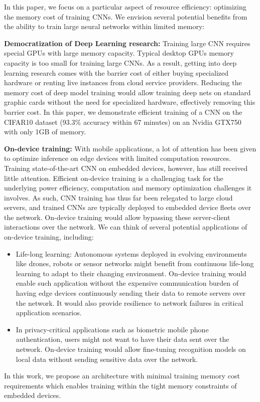 \documentclass[twocolumn]{bmcart}
\begin{document}
In this paper, we focus on a particular aspect of resource efficiency: optimizing the memory cost of training CNNs. 
We envision several potential benefits from the ability to train large neural networks within limited memory:

\textbf{Democratization of Deep Learning research:} 
Training large CNN requires special GPUs with large memory capacity. 
Typical desktop GPUs memory capacity is too small for training large CNNs.
As a result, getting into deep learning research comes with the barrier cost of either buying specialized hardware or renting live instances from cloud service providers. 
Reducing the memory cost of deep model training would allow training deep nets on standard graphic cards without the need for specialized hardware, effectively removing this barrier cost.
In this paper, we demonstrate efficient training of a CNN on the CIFAR10 dataset (93.3\% accuracy within 67 minutes) on an Nvidia GTX750 with only 1GB of memory.

\textbf{On-device training:}
With mobile applications, a lot of attention has been given to optimize inference on edge devices with limited computation resources.
Training state-of-the-art CNN on embedded devices, however, has still received little attention.
Efficient on-device training is a challenging task for the underlying power efficiency, computation and memory optimization challenges it involves.
As such, CNN training has thus far been relegated to large cloud servers, and trained CNNs are typically deployed to embedded device fleets over the network.
On-device training would allow bypassing these server-client interactions over the network.
We can think of several potential applications of on-device training, including:
\begin{itemize}
 \item Life-long learning: Autonomous systems deployed in evolving environments like drones, robots or sensor networks might benefit from continuous life-long learning to adapt to their changing environment.
On-device training would enable such application without the expensive communication burden of having edge devices continuously sending their data to remote servers over the network. It would also provide resilience to network failures in critical application scenarios.
 \item In privacy-critical applications such as biometric mobile phone authentication, users might not want to have their data sent over the network. 
On-device training would allow fine-tuning recognition models on local data without sending sensitive data over the network.
\end{itemize}
In this work, we propose an architecture with minimal training memory cost requirements which enables training within the tight memory constraints of embedded devices. 
\end{document}
